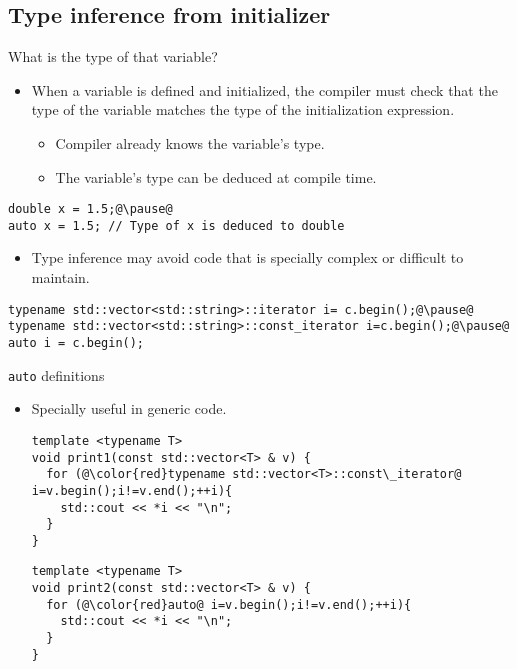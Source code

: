 \subsection{Type inference from initializer}

\begin{frame}[t,fragile]{What is the type of that variable?}
  \begin{itemize}
    \item When a variable is defined and initialized, 
          the compiler must check that the type of the variable
          matches the type of the initialization expression.
      \begin{itemize}
        \item Compiler already knows the variable's type.
        \item The variable's type can be deduced at compile time.
      \end{itemize}
  \end{itemize}
\pause
\begin{lstlisting}[escapechar=@]
double x = 1.5;@\pause@
auto x = 1.5; // Type of x is deduced to double
\end{lstlisting}
\pause
  \begin{itemize}
    \item Type inference may avoid code that is specially 
       complex or difficult to maintain.
  \end{itemize}
\pause
\begin{lstlisting}[escapechar=@]
typename std::vector<std::string>::iterator i= c.begin();@\pause@
typename std::vector<std::string>::const_iterator i=c.begin();@\pause@
auto i = c.begin();
\end{lstlisting}
\end{frame}

\begin{frame}[t,fragile]{\texttt{auto} definitions}
\begin{itemize}
\item Specially useful in generic code.
\begin{lstlisting}[escapechar=@]
template <typename T>
void print1(const std::vector<T> & v) {
  for (@\color{red}typename std::vector<T>::const\_iterator@ i=v.begin();i!=v.end();++i){
    std::cout << *i << "\n";
  }
}
\end{lstlisting}
\begin{lstlisting}[escapechar=@]
template <typename T>
void print2(const std::vector<T> & v) {
  for (@\color{red}auto@ i=v.begin();i!=v.end();++i){
    std::cout << *i << "\n";
  }
}
\end{lstlisting}
\end{itemize}
\end{frame}

